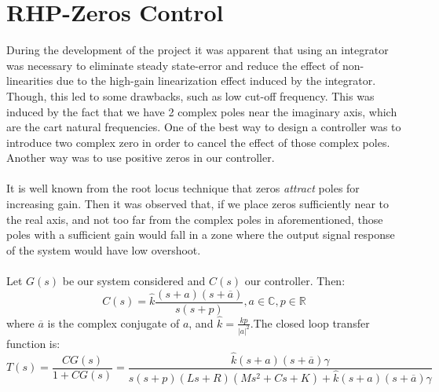 \section{RHP-Zeros Control}
During the development of the project it was apparent that using an integrator was necessary to eliminate steady state-error and reduce the effect of non-linearities due to the high-gain linearization effect induced by the integrator. Though, this led to some drawbacks, such as low cut-off frequency. This was induced by the fact that we have 2 complex poles near the imaginary axis, which are the cart natural frequencies. One of the best way to design a controller was to introduce two complex zero in order to cancel the effect of those complex poles. Another way was to use positive zeros in our controller.\\ \\
It is well known from the root locus technique that zeros \emph{attract} poles for increasing gain. Then it was observed that, if we place zeros sufficiently near to the real axis, and not too far from the complex poles in aforementioned, those poles with a sufficient gain would fall in a zone where the output signal response of the system would have low overshoot. \\ \\
Let $G(s)$ be our system considered and $C(s)$ our controller. Then:
$$C(s) = \hat{k}\frac{(s+a)(s+\overline{a})}{s(s+p)}, a \in \mathbb{C}, p \in \mathbb{R}$$
where $\overline{a}$ is the complex conjugate of $a$, and $\hat{k}=\frac{kp}{|a|^2}$.The closed loop transfer function is:
$$T(s) = \frac{CG(s)}{1+CG(s)} = \frac{\hat{k}(s+a)(s+\overline{a})\gamma}{s(s+p)(Ls+R)(Ms^2+Cs+K)+\hat{k}(s+a)(s+\overline{a})\gamma}$$